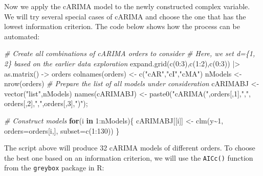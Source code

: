 \documentclass[
]{book}
\newenvironment{Shaded}{\begin{snugshade}}{\end{snugshade}}
\newcommand{\AttributeTok}[1]{\textcolor[rgb]{0.77,0.63,0.00}{#1}}
\newcommand{\CommentTok}[1]{\textcolor[rgb]{0.56,0.35,0.01}{\textit{#1}}}
\newcommand{\ControlFlowTok}[1]{\textcolor[rgb]{0.13,0.29,0.53}{\textbf{#1}}}
\newcommand{\DecValTok}[1]{\textcolor[rgb]{0.00,0.00,0.81}{#1}}
\newcommand{\FunctionTok}[1]{\textcolor[rgb]{0.00,0.00,0.00}{#1}}
\newcommand{\NormalTok}[1]{#1}
\newcommand{\OtherTok}[1]{\textcolor[rgb]{0.56,0.35,0.01}{#1}}
\newcommand{\SpecialCharTok}[1]{\textcolor[rgb]{0.00,0.00,0.00}{#1}}
\newcommand{\StringTok}[1]{\textcolor[rgb]{0.31,0.60,0.02}{#1}}
\begin{document}
Now we apply the cARIMA model to the newly constructed complex variable. We will try several special cases of cARIMA and choose the one that has the lowest information criterion. The code below shows how the process can be automated:

\begin{Shaded}
\begin{Highlighting}[]
\CommentTok{\# Create all combinations of cARIMA orders to consider}
\CommentTok{\# Here, we set d=\{1, 2\} based on the earlier data exploration}
\FunctionTok{expand.grid}\NormalTok{(}\FunctionTok{c}\NormalTok{(}\DecValTok{0}\SpecialCharTok{:}\DecValTok{3}\NormalTok{),}\FunctionTok{c}\NormalTok{(}\DecValTok{1}\SpecialCharTok{:}\DecValTok{2}\NormalTok{),}\FunctionTok{c}\NormalTok{(}\DecValTok{0}\SpecialCharTok{:}\DecValTok{3}\NormalTok{)) }\SpecialCharTok{|\textgreater{}}
    \FunctionTok{as.matrix}\NormalTok{() }\OtherTok{{-}\textgreater{}}\NormalTok{ orders}
\FunctionTok{colnames}\NormalTok{(orders) }\OtherTok{\textless{}{-}} \FunctionTok{c}\NormalTok{(}\StringTok{"cAR"}\NormalTok{,}\StringTok{"cI"}\NormalTok{,}\StringTok{"cMA"}\NormalTok{)}
\NormalTok{nModels }\OtherTok{\textless{}{-}} \FunctionTok{nrow}\NormalTok{(orders)}
\CommentTok{\# Prepare the list of all models under consideration}
\NormalTok{cARIMABJ }\OtherTok{\textless{}{-}} \FunctionTok{vector}\NormalTok{(}\StringTok{"list"}\NormalTok{,nModels)}
\FunctionTok{names}\NormalTok{(cARIMABJ) }\OtherTok{\textless{}{-}} \FunctionTok{paste0}\NormalTok{(}\StringTok{"cARIMA("}\NormalTok{,orders[,}\DecValTok{1}\NormalTok{],}\StringTok{","}\NormalTok{,}
\NormalTok{                          orders[,}\DecValTok{2}\NormalTok{],}\StringTok{","}\NormalTok{,orders[,}\DecValTok{3}\NormalTok{],}\StringTok{")"}\NormalTok{);}

\CommentTok{\# Construct models}
\ControlFlowTok{for}\NormalTok{(i }\ControlFlowTok{in} \DecValTok{1}\SpecialCharTok{:}\NormalTok{nModels)\{}
\NormalTok{    cARIMABJ[[i]] }\OtherTok{\textless{}{-}} \FunctionTok{clm}\NormalTok{(y}\SpecialCharTok{\textasciitilde{}}\DecValTok{1}\NormalTok{, }\AttributeTok{orders=}\NormalTok{orders[i,], }\AttributeTok{subset=}\FunctionTok{c}\NormalTok{(}\DecValTok{1}\SpecialCharTok{:}\DecValTok{130}\NormalTok{))}
\NormalTok{\}}
\end{Highlighting}
\end{Shaded}

The script above will produce 32 cARIMA models of different orders. To choose the best one based on an information criterion, we will use the \texttt{AICc()} function from the \texttt{greybox} package in R:
\end{document}
